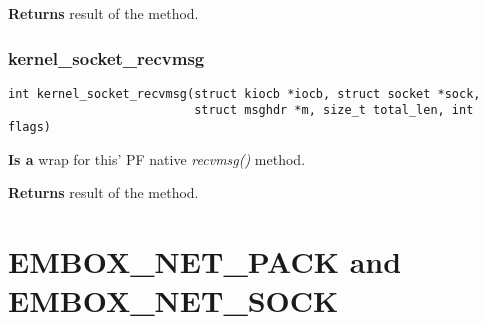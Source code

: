 \documentclass[12pt,a4paper]{article}
\begin{document}
{\bf Returns} result of the method.


\subsubsection{kernel\_socket\_recvmsg}
\label{sec:kernel_socket_kernel_socket_recvmsg}
\begin{verbatim}
int kernel_socket_recvmsg(struct kiocb *iocb, struct socket *sock,
                          struct msghdr *m, size_t total_len, int flags)
\end{verbatim}
{\bf Is a} wrap for this' PF native {\it recvmsg()} method.

{\bf Returns} result of the method.

\newpage
\section {EMBOX\_NET\_PACK and EMBOX\_NET\_SOCK}
\label{sec:embox_net_pack_and_sock}
\end{document}
